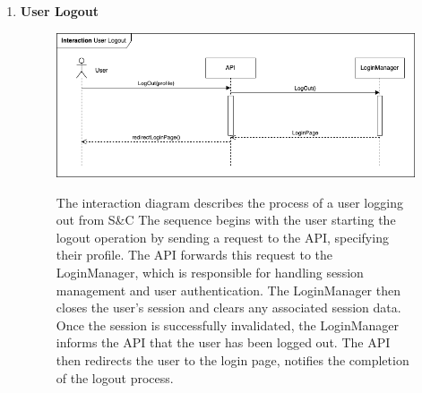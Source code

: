 \begin{enumerate}
    \newpage
    \item \textbf{User Logout}
    \begin{figure}[h!]
            \centering  \includegraphics[width=1\textwidth]{DD/Images/Interactions/INT02_UserLogout.drawio.png}
            \label{fig:ComponentViewDiagram}
            \caption*{The interaction diagram describes the process of a user logging out from S\&C The sequence begins with the user starting the logout operation by sending a request to the API, specifying their profile. The API forwards this request to the LoginManager, which is responsible for handling session management and user authentication. The LoginManager then closes the user's session and clears any associated session data. Once the session is successfully invalidated, the LoginManager informs the API that the user has been logged out. The API then redirects the user to the login page, notifies the completion of the logout process.
            }
    \end{figure}


\end{enumerate}
